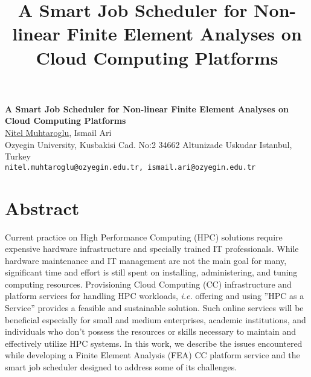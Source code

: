 \title{A Smart Job Scheduler for Non-linear Finite Element Analyses on Cloud Computing Platforms}
\author{} \institute{}

\begin{center}

\textbf{\Large A Smart Job Scheduler for Non-linear Finite Element Analyses on Cloud Computing Platforms}\\
\vspace{10mm}
{\large  \underline{Nitel Muhtaroglu}, Ismail Ari}\\
Ozyegin University, Kusbakisi Cad. No:2 34662 Altunizade Uskudar Istanbul, Turkey\\
{\tt nitel.muhtaroglu@ozyegin.edu.tr, ismail.ari@ozyegin.edu.tr}

\end{center}

\section*{Abstract}

Current practice on High Performance Computing (HPC) solutions require expensive hardware infrastructure and specially trained IT professionals. While hardware maintenance and IT management are not the main goal for many, significant time and effort is still spent on installing, administering, and tuning computing resources. Provisioning Cloud Computing (CC) infrastructure and platform services for handling HPC workloads, \emph{i.e.} offering and using ''HPC as a Service'' provides a feasible and sustainable solution. Such online services will be beneficial especially for small and medium enterprises, academic institutions, and individuals who don't possess the resources or skills necessary to maintain and effectively utilize HPC systems. In this work, we describe the issues encountered while developing a Finite Element Analysis (FEA) CC platform service and the smart job scheduler designed to address some of its challenges.

